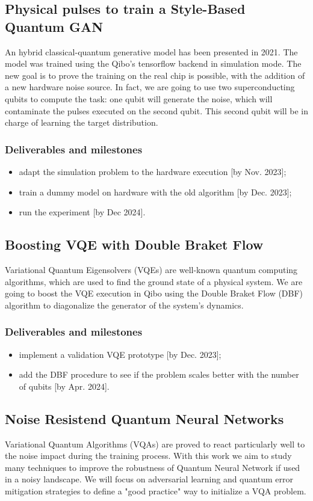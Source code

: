 \documentclass[11pt]{article}
\begin{document}
\subsection{Physical pulses to train a Style-Based Quantum GAN}
An hybrid classical-quantum generative model has been presented in 2021. The model 
was trained using the Qibo's tensorflow backend in simulation mode. The new goal 
is to prove the training on the real chip is possible, with the addition of a new
hardware noise source. In fact, we are going to use two superconducting qubits to compute the 
task: one qubit will generate the noise, which will contaminate the pulses executed 
on the second qubit. This second qubit will be in charge of learning the target 
distribution. 


\subsubsection*{Deliverables and milestones}
\begin{itemize}[noitemsep]
\item adapt the simulation problem to the hardware execution [by Nov. 2023];
\item train a dummy model on hardware with the old algorithm [by Dec. 2023];
\item run the experiment [by Dec 2024].
\end{itemize}

\subsection{Boosting VQE with Double Braket Flow}
Variational Quantum Eigensolvers (VQEs) are well-known quantum computing algorithms,
which are used to find the ground state of a physical system. We are going to 
boost the VQE execution in Qibo using the Double Braket Flow (DBF) algorithm to 
diagonalize the generator of the system's dynamics. 


\subsubsection*{Deliverables and milestones}
\begin{itemize}[noitemsep]
\item implement a validation VQE prototype [by Dec. 2023];
\item add the DBF procedure to see if the problem scales better with the number 
of qubits [by Apr. 2024].
\end{itemize}


\subsection{Noise Resistend Quantum Neural Networks}
Variational Quantum Algorithms (VQAs) are proved to react particularly well to the noise
impact during the training process. With this work we aim to study many techniques 
to improve the robustness of Quantum Neural Network if used in a noisy landscape.
We will focus on adversarial learning and quantum error mitigation strategies 
to define a "good practice" way to initialize a VQA problem.
\end{document}
